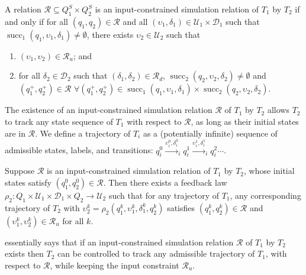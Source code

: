 \begin{definition}
  \label{thm:ex-simulation-relation}
  A relation $\mathcal{R} \subseteq Q^{S}_1 \times Q^{S}_2$ is an input-constrained simulation relation of $T_1$ by $T_2$ if and only if for all $(q_1, q_2) \in \mathcal{R}$ and all $(\upsilon_{1}, \delta_{1}) \in \mathcal{U}_{1} \times \mathcal{D}_{1}$ such that $\operatorname{succ}_{1} (q_{1}, \upsilon_{1}, \delta_{1}) \neq \emptyset$, there exists $\upsilon_{2} \in \mathcal{U}_{2}$ such that
    \begin{enumerate}
    \item $(\upsilon_{1}, \upsilon_{2}) \in \mathcal{R}_{u}$; and
    \item for all $\delta_{2} \in \mathcal{D}_{2}$ such that $(\delta_{1}, \delta_{2}) \in \mathcal{R}_{d}$, $\operatorname{succ}_{2} (q_{2}, \upsilon_{2}, \delta_{2}) \neq \emptyset$ and $(q_{1}^{+}, q_{2}^{+}) \in \mathcal{R}$ %
      $\forall (q_{1}^{+}, q_{2}^{+}) \in \operatorname{succ}_{1} (q_{1}, \upsilon_{1}, \delta_{1}) \times \operatorname{succ}_{2} (q_{2}, \upsilon_{2}, \delta_{2})$.
    \end{enumerate}
\end{definition}


The existence of an input-constrained simulation relation $\mathcal{R}$ of $T_{1}$ by $T_{2}$ allows $T_{2}$ to track any state sequence of $T_{1}$ with respect to $\mathcal{R}$, as long as their initial states are in $\mathcal{R}$.
We define a trajectory of $T_{i}$ as a (potentially infinite) sequence of admissible states, labels, and transitions: $q_{i}^{0} \xrightarrow{\upsilon_{i}^{0}, \delta_{i}^{0}}_{i} q_{i}^{1} \xrightarrow{\upsilon_{i}^{1}, \delta_{i}^{1}}_{i} q_{i}^{2} \cdots$.


\begin{theorem}
  Suppose $\mathcal{R}$ is an input-constrained simulation relation of $T_{1}$ by $T_{2}$, whose initial states satisfy $(q_{1}^{0}, q_{2}^{0}) \in \mathcal{R}$.
  Then there exists a feedback law $\rho_{2}: Q_{1} \times \mathcal{U}_{1} \times \mathcal{D}_{1} \times Q_{2} \to \mathcal{U}_{2}$ %
  such that for any trajectory of $T_{1}$, %
  any corresponding trajectory of $T_{2}$ with $\upsilon_{2}^{k} = \rho_{2} (q_{1}^{k}, \upsilon_{1}^{k}, \delta_{1}^{k}, q_{2}^{k})$ satisfies $(q_{1}^{k}, q_{2}^{k}) \in \mathcal{R}$ and $(\upsilon_{1}^{k}, \upsilon_{2}^{k}) \in \mathcal{R}_{u}$ for all $k$.
\end{theorem}

 essentially says that if an input-constrained simulation relation $\mathcal{R}$ of $T_{1}$ by $T_2$ exists then $T_{2}$ can be controlled to track any admissible trajectory of $T_{1}$, with respect to $\mathcal{R}$, while keeping the input constraint $\mathcal{R}_{u}$.

